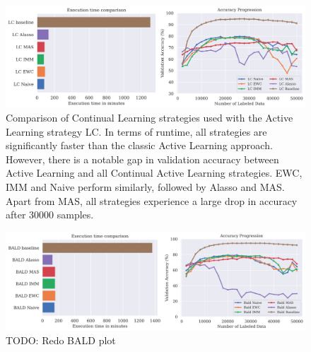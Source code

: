 \begin{figure} [ht]
    \centering
    \includegraphics[width=\linewidth]{images/results_CAL/LC_CAL_2000b.png}
    \caption[Continual Active Learning Random 2000 batch size]{Comparison of Continual Learning strategies used with the Active Learning strategy LC. In terms of runtime, all
    strategies are significantly faster than the classic Active Learning approach. However, there is a notable gap in validation accuracy between Active Learning and all Continual
    Active Learning strategies. EWC, IMM and Naive perform similarly, followed by Alasso and MAS. Apart from MAS, all strategies experience a large drop in accuracy after 30000 samples.}
    \label{fig:Evaluation:Results:CAL:LC2000}
\end{figure}

\begin{figure} [ht]
    \centering
    \includegraphics[width=\linewidth]{images/results_CAL/Bald_CAL_2000b.png}
    \caption[Continual Active Learning BALD 2000 batch size]{TODO: Redo BALD plot}
    \label{fig:Evaluation:Results:CAL:BALD2000}
\end{figure}

